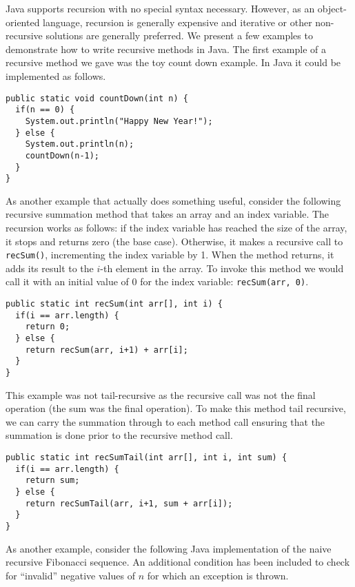 

Java supports recursion with no special syntax necessary.  
However, as an object-oriented language, recursion is generally 
expensive and iterative or
other non-recursive solutions are generally preferred.  We present
a few examples to demonstrate how to write recursive methods in Java.
The first example of a recursive method we gave was the toy count down
example.  In Java it could be implemented as follows.

\begin{verbatim}
public static void countDown(int n) {
  if(n == 0) {
    System.out.println("Happy New Year!");
  } else {
    System.out.println(n);
    countDown(n-1);
  }
}
\end{verbatim}

As another example that actually does something useful, consider the
following recursive summation method that takes an array 
and an index variable.  The recursion works as follows: if the index
variable has reached the size of the array, it stops and returns zero
(the base case).  Otherwise, it makes a recursive call to 
\texttt{recSum()}, incrementing the index variable by 1.  When
the method returns, it adds its result to the $i$-th element
in the array.  To invoke this method we would call it with an initial
value of 0 for the index variable: \texttt{recSum(arr, 0)}.

\begin{verbatim}
public static int recSum(int arr[], int i) {
  if(i == arr.length) {
    return 0;
  } else {
    return recSum(arr, i+1) + arr[i];
  }
}
\end{verbatim}

This example was not tail-recursive as the recursive call was not the
final operation (the sum was the final operation).  To make this method
tail recursive, we can carry the summation through to each method call
ensuring that the summation is done prior to the recursive method call.

\begin{verbatim}
public static int recSumTail(int arr[], int i, int sum) {
  if(i == arr.length) {
    return sum;
  } else {
    return recSumTail(arr, i+1, sum + arr[i]);
  }
}
\end{verbatim}

As another example, consider the following Java implementation of the 
naive recursive Fibonacci sequence.  An additional condition has been
included to check for ``invalid'' negative values of $n$ for which
an exception is thrown.

